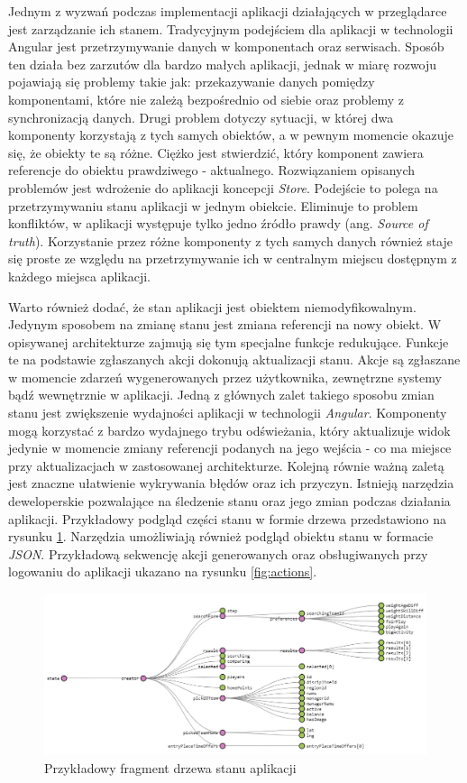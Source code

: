 Jednym z wyzwań podczas implementacji aplikacji działających w przeglądarce jest zarządzanie ich stanem. Tradycyjnym podejściem dla aplikacji w technologii Angular jest przetrzymywanie danych w komponentach oraz serwisach. Sposób ten działa bez zarzutów dla bardzo małych aplikacji, jednak w miarę rozwoju pojawiają się problemy takie jak: przekazywanie danych pomiędzy komponentami, które nie zależą bezpośrednio od siebie oraz problemy z synchronizacją danych. Drugi problem dotyczy sytuacji, w której dwa komponenty korzystają z tych samych obiektów, a w pewnym momencie okazuje się, że obiekty te są różne. Ciężko jest stwierdzić, który komponent zawiera referencje do obiektu prawdziwego - aktualnego. Rozwiązaniem opisanych problemów jest wdrożenie do aplikacji koncepcji \textit{Store}. Podejście to polega na przetrzymywaniu stanu aplikacji w jednym obiekcie. Eliminuje to problem konfliktów, w aplikacji występuje tylko jedno źródło prawdy (ang. \textit{Source of truth}). Korzystanie przez różne komponenty z tych samych danych również staje się proste ze względu na przetrzymywanie ich w centralnym miejscu dostępnym z każdego miejsca aplikacji.

Warto również dodać, że stan aplikacji jest obiektem niemodyfikowalnym. Jedynym sposobem na zmianę stanu jest zmiana referencji na nowy obiekt. W opisywanej architekturze zajmują się tym specjalne funkcje redukujące. Funkcje te na podstawie zgłaszanych akcji dokonują aktualizacji stanu. Akcje są zgłaszane w momencie zdarzeń wygenerowanych przez użytkownika, zewnętrzne systemy bądź wewnętrznie w aplikacji. Jedną z głównych zalet takiego sposobu zmian stanu jest zwiększenie wydajności aplikacji w technologii \textit{Angular}. Komponenty mogą korzystać z bardzo wydajnego trybu odświeżania, który aktualizuje widok jedynie w momencie zmiany referencji podanych na jego wejścia - co ma miejsce przy aktualizacjach w zastosowanej architekturze. Kolejną równie ważną zaletą jest znaczne ułatwienie wykrywania błędów oraz ich przyczyn. Istnieją narzędzia deweloperskie pozwalające na śledzenie stanu  oraz jego zmian podczas działania aplikacji. Przykładowy podgląd części stanu w formie drzewa przedstawiono na rysunku \ref{fig:state}. Narzędzia umożliwiają również podgląd obiektu stanu w formacie \textit{JSON}. Przykładową sekwencję akcji generowanych oraz obsługiwanych przy logowaniu do aplikacji ukazano na rysunku \ref{fig:actions}.

\begin{figure}[H]
\centering
\includegraphics[width=\linewidth]{06-implementacja/rys/state-after.PNG}
\caption{Przykładowy fragment drzewa stanu aplikacji}
\label{fig:state}
\end{figure}


